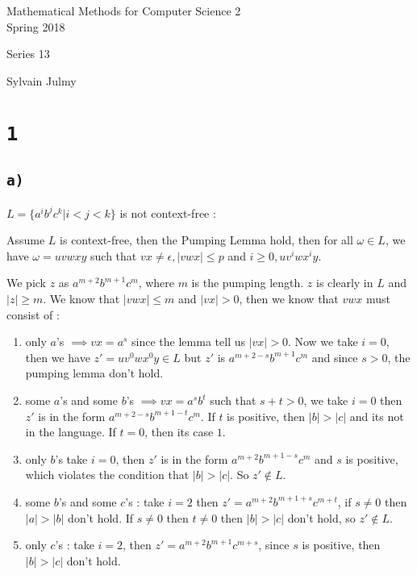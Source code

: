 \documentclass[a4paper,11pt]{report}
\author{Sylvain Julmy}
\date{\today}
\begin{document}
\begin{center}
  \Large{
    Mathematical Methods for Computer Science 2\\
    Spring 2018
  }
  \noindent\makebox[\linewidth]{\rule{\linewidth}{0.4pt}}

  Series 13
  \vspace*{1.4cm}

  Sylvain Julmy
  
  \noindent\makebox[\linewidth]{\rule{\linewidth}{0.4pt}}
\end{center}

\section*{\texttt{1}}

\subsection*{\texttt{a)}}

$L = \{a^ib^jc^k | i < j < k\}$ is not context-free :

Assume $L$ is context-free, then the Pumping Lemma hold, then for all $\omega
\in L$, we have $\omega = uvwxy$ such that $vx \neq \epsilon, |vwx| \leq p$ and
$i \geq 0, uv^iwx^iy$.

We pick $z$ as $a^{m+2}b^{m+1}c^{m}$, where $m$ is the pumping length. $z$ is
clearly in $L$ and $|z| \geq m$. We know that $|vwx| \leq m$ and $|vx| > 0$,
then we know that $vwx$ must consist of :

\begin{enumerate}
\item only $a$'s $\implies vx = a^s$ since the lemma tell us $|vx| > 0$. Now we
  take $i=0$, then we have $z' = uv^0wx^0y \in L$ but $z'$ is
  $a^{m+2-s}b^{m+1}c^{m}$ and since $s > 0$, the pumping lemma don't hold.
\item some $a$'s and some $b$'s $\implies vx = a^sb^t$ such that $s+t > 0$, we
  take $i=0$ then $z'$ is in the form $a^{m+2-s}b^{m+1-t}c^m$. If $t$ is
  positive, then $|b| > |c|$ and its not in the language. If $t = 0$, then its
  case $1$.
\item only $b$'s take $i = 0$, then $z'$ is in the form $a^{m+2}b^{m+1-s}c^{m}$
  and $s$ is positive, which violates the condition that $|b| > |c|$. So $z'
  \not\in L$.
\item some $b$'s and some $c$'s : take $i = 2$ then $z' =
  a^{m+2}b^{m+1+s}c^{m+t}$, if $s \neq 0$ then $|a| > |b|$ don't hold. If $s
  \neq 0$ then $t \neq 0$ then $|b| > |c|$ don't hold, so $z' \not\in L$.
\item only $c$'s : take $i=2$, then $z' = a^{m+2}b^{m+1}c^{m+s}$, since $s$ is
  positive, then $|b| > |c|$ don't hold.
\end{enumerate}
\end{document}
